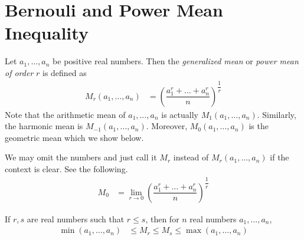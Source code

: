 \documentclass{subfile}
\begin{document}
	\section{Bernouli and Power Mean Inequality}\label{sec:powermean}
	
		\begin{definition}
			Let $a_1,\ldots,a_n$ be positive real numbers. Then the \textit{generalized mean} or \textit{power mean of order} $r$ is defined as
				\begin{align*}
					M_r(a_1,\ldots,a_n)
						& = \left(\dfrac{a_1^r+\ldots+a_n^r}{n}\right)^{\dfrac{1}{r}}
				\end{align*}
			Note that the arithmetic mean of $a_1,\ldots,a_n$ is actually $M_1(a_1,\ldots,a_n)$. Similarly, the harmonic mean is $M_{-1}(a_1,\ldots,a_n)$. Moreover, $M_0(a_1,\ldots,a_n)$ is the geometric mean which we show below.
		\end{definition}
	We may omit the numbers and just call it $M_r$ instead of $M_r(a_1,\ldots,a_n)$ if the context is clear. See the following.
		\begin{align*}
			M_0
				& = \lim\limits_{r\to0}\left(\dfrac{a_1^r+\ldots+a_n^r}{n}\right)^{\dfrac{1}{r}}
		\end{align*}
	
		\begin{theorem}
			If $r,s$ are real numbers such that $r\leq s$, then for $n$ real numbers $a_1,\ldots,a_n$,
				\begin{align*}
					\min(a_1,\ldots,a_n)
						& \leq M_r\leq M_s\leq\max(a_1,\ldots,a_n)
				\end{align*}
		\end{theorem}
\end{document}
